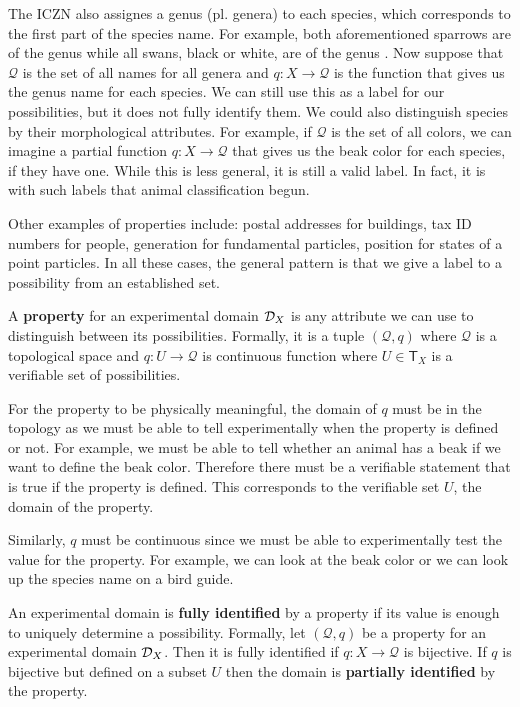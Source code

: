 \documentclass[11pt,letterpaper,fleqn]{memoir} %
\begin{document}
The ICZN also assignes a genus (pl. genera) to each species, which corresponds to the first part of the species name. For example, both aforementioned sparrows are of the genus  while all swans, black or white, are of the genus . Now suppose that $\mathcal{Q}$ is the set of all names for all genera and $q: X \to \mathcal{Q}$ is the function that gives us the genus name for each species. We can still use this as a label for our possibilities, but it does not fully identify them. We could also distinguish species by their morphological attributes. For example, if $\mathcal{Q}$ is the set of all colors, we can imagine a partial function $q: X \to \mathcal{Q}$ that gives us the beak color for each species, if they have one. While this is less general, it is still a valid label. In fact, it is with such labels that animal classification begun.

Other examples of properties include: postal addresses for buildings, tax ID numbers for people, generation for fundamental particles, position for states of a point particles. In all these cases, the general pattern is that we give a label to a possibility from an established set.

\begin{mathSection}
	\begin{defn}
		A \textbf{property} for an experimental domain $\mathcal{D}_X$ is any attribute we can use to distinguish between its possibilities. Formally, it is a tuple $(\mathcal{Q}, q)$ where $\mathcal{Q}$ is a topological space and $q : U \to \mathcal{Q}$ is continuous function where $U \in \mathsf{T}_X$ is a verifiable set of possibilities.
	\end{defn}
	\begin{justification}
		For the property to be physically meaningful, the domain of $q$ must be in the topology as we must be able to tell experimentally when the property is defined or not. For example, we must be able to tell whether an animal has a beak if we want to define the beak color. Therefore there must be a verifiable statement that is true if the property is defined. This corresponds to the verifiable set $U$, the domain of the property.
		
		Similarly, $q$ must be continuous since we must be able to experimentally test the value for the property. For example, we can look at the beak color or we can look up the species name on a bird guide.
	\end{justification}
	\begin{defn}
		An experimental domain is \textbf{fully identified} by a property if its value is enough to uniquely determine a possibility. Formally, let $(\mathcal{Q}, q)$ be a property for an experimental domain $\mathcal{D}_X$. Then it is fully identified if $q: X \to \mathcal{Q}$ is bijective. If $q$ is bijective but defined on a subset $U$ then the domain is \textbf{partially identified} by the property.
	\end{defn}
\end{mathSection}
\end{document}
